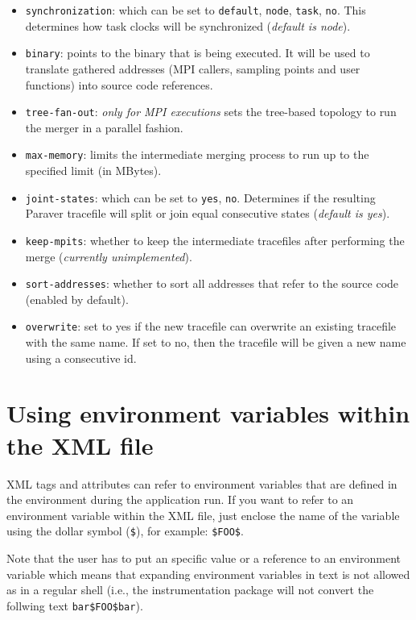 \begin{itemize}
 \item {\tt synchronization}: which can be set to {\tt default}, {\tt node}, {\tt task}, {\tt no}. This determines how task clocks will be synchronized ({\em default is node}).
 \item {\tt binary}: points to the binary that is being executed. It will be used to translate gathered addresses (MPI callers, sampling points and user functions) into source code references.
 \item {\tt tree-fan-out}: {\em only for MPI executions} sets the tree-based topology to run the merger in a parallel fashion.
 \item {\tt max-memory}: limits the intermediate merging process to run up to the specified limit (in MBytes).
 \item {\tt joint-states}: which can be set to {\tt yes}, {\tt no}. Determines if the resulting Paraver tracefile will split or join equal consecutive states ({\em default is yes}).
 \item {\tt keep-mpits}: whether to keep the intermediate tracefiles after performing the merge ({\em currently unimplemented}).
 \item {\tt sort-addresses}: whether to sort all addresses that refer to the source code (enabled by default).
 \item {\tt overwrite}: set to yes if the new tracefile can overwrite an existing tracefile with the same name. If set to no, then the tracefile will be given a new name using a consecutive id.
\end{itemize}


\section{Using environment variables within the XML file}\label{sec:EnvVars_in_XML}

XML tags and attributes can refer to environment variables that are defined in the environment during the application run. If you want to refer to an environment variable within the XML file, just enclose the name of the variable using the dollar symbol ({\tt \$}), for example: {\tt \$FOO\$}.

Note that the user has to put an specific value or a reference to an environment variable which means that expanding environment variables in text is not allowed as in a regular shell (i.e., the instrumentation package will not convert the follwing text {\tt bar\$FOO\$bar}).

